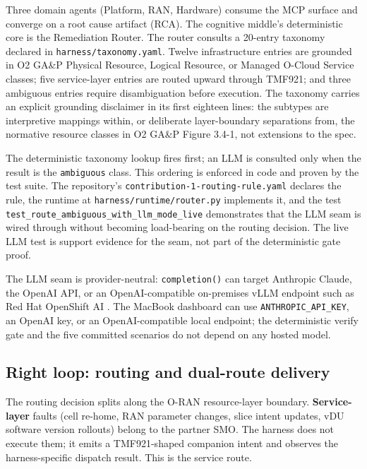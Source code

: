 \documentclass[twocolumn,10pt,a4paper]{article}
\begin{document}
Three domain agents (Platform, RAN, Hardware) consume the MCP surface and converge on a root cause artifact (RCA). The cognitive middle's deterministic core is the Remediation Router. The router consults a 20-entry taxonomy declared in \texttt{harness/taxonomy.yaml}. Twelve infrastructure entries are grounded in O2 GA\&P Physical Resource, Logical Resource, or Managed O-Cloud Service classes; five service-layer entries are routed upward through TMF921; and three ambiguous entries require disambiguation before execution. The taxonomy carries an explicit grounding disclaimer in its first eighteen lines: the subtypes are interpretive mappings within, or deliberate layer-boundary separations from, the normative resource classes in O2 GA\&P Figure 3.4-1, not extensions to the spec.

The deterministic taxonomy lookup fires first; an LLM is consulted only when the result is the \texttt{ambiguous} class. This ordering is enforced in code and proven by the test suite. The repository's \texttt{contribution-1-routing-rule.yaml} declares the rule, the runtime at \texttt{harness/runtime/router.py} implements it, and the test \texttt{test\_route\_ambiguous\_with\_llm\_mode\_live} demonstrates that the LLM seam is wired through without becoming load-bearing on the routing decision. The live LLM test is support evidence for the seam, not part of the deterministic gate proof.

The LLM seam is provider-neutral: \texttt{completion()} can target Anthropic Claude, the OpenAI API, or an OpenAI-compatible on-premises vLLM endpoint such as Red Hat OpenShift AI \cite{litellm}. The MacBook dashboard can use \texttt{ANTHROPIC\_API\_KEY}, an OpenAI key, or an OpenAI-compatible local endpoint; the deterministic verify gate and the five committed scenarios do not depend on any hosted model.

\subsection{Right loop: routing and dual-route delivery}

The routing decision splits along the O-RAN resource-layer boundary. \textbf{Service-layer} faults (cell re-home, RAN parameter changes, slice intent updates, vDU software version rollouts) belong to the partner SMO. The harness does not execute them; it emits a TMF921-shaped companion intent \cite{tmf921} and observes the harness-specific dispatch result. This is the service route.
\end{document}
